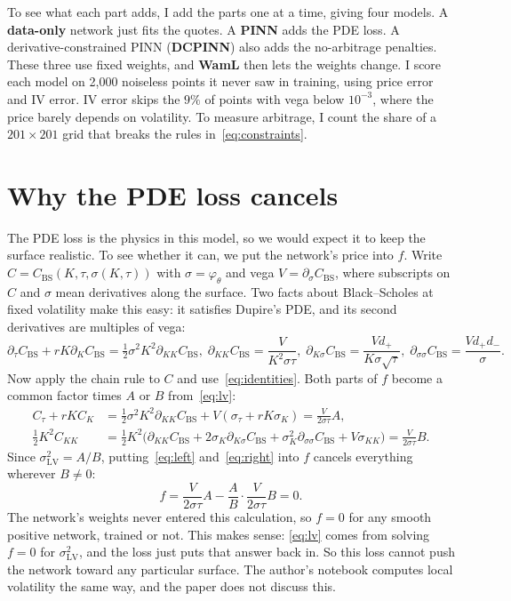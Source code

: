 \documentclass[10pt]{article}
\begin{document}
To see what each part adds, I add the parts one at a time, giving four models. A \textbf{data-only} network just fits the quotes. A \textbf{PINN} adds the PDE loss. A derivative-constrained PINN (\textbf{DCPINN}) also adds the no-arbitrage penalties. These three use fixed weights, and \textbf{WamL} then lets the weights change. I score each model on 2,000 noiseless points it never saw in training, using price error and IV error. IV error skips the $9\%$ of points with vega below $10^{-3}$, where the price barely depends on volatility. To measure arbitrage, I count the share of a $201\times201$ grid that breaks the rules in~\eqref{eq:constraints}.

\section{Why the PDE loss cancels}
\label{sec:residual}
The PDE loss is the physics in this model, so we would expect it to keep the surface realistic. To see whether it can, we put the network's price into $f$. Write $C=C_{\mathrm{BS}}(K,\tau,\sigma(K,\tau))$ with $\sigma=\varphi_\theta$ and vega $V=\partial_\sigma C_{\mathrm{BS}}$, where subscripts on $C$ and $\sigma$ mean derivatives along the surface. Two facts about Black--Scholes at fixed volatility make this easy: it satisfies Dupire's PDE, and its second derivatives are multiples of vega:
\begin{equation}
  \partial_\tau C_{\mathrm{BS}}+rK\partial_K C_{\mathrm{BS}}=\tfrac12\sigma^2K^2\partial_{KK}C_{\mathrm{BS}},\;
  \partial_{KK}C_{\mathrm{BS}}=\frac{V}{K^2\sigma\tau},\;
  \partial_{K\sigma}C_{\mathrm{BS}}=\frac{Vd_+}{K\sigma\sqrt{\tau}},\;
  \partial_{\sigma\sigma}C_{\mathrm{BS}}=\frac{Vd_+d_-}{\sigma}.
  \label{eq:identities}
\end{equation}
Now apply the chain rule to $C$ and use~\eqref{eq:identities}. Both parts of $f$ become a common factor times $A$ or $B$ from~\eqref{eq:lv}:
\begin{align}
  C_\tau+rKC_K&=\tfrac12\sigma^2K^2\partial_{KK}C_{\mathrm{BS}}+V(\sigma_\tau+rK\sigma_K)=\frac{V}{2\sigma\tau}A,\label{eq:left}\\
  \tfrac12K^2C_{KK}&=\tfrac12K^2\big(\partial_{KK}C_{\mathrm{BS}}+2\sigma_K\partial_{K\sigma}C_{\mathrm{BS}}+\sigma_K^2\partial_{\sigma\sigma}C_{\mathrm{BS}}+V\sigma_{KK}\big)=\frac{V}{2\sigma\tau}B.\label{eq:right}
\end{align}
Since $\sigma_{\mathrm{LV}}^2=A/B$, putting~\eqref{eq:left} and~\eqref{eq:right} into $f$ cancels everything wherever $B\neq0$:
\begin{equation}
  f=\frac{V}{2\sigma\tau}A-\frac{A}{B}\cdot\frac{V}{2\sigma\tau}B=0.
  \label{eq:cancel}
\end{equation}
The network's weights never entered this calculation, so $f=0$ for any smooth positive network, trained or not. This makes sense: \eqref{eq:lv} comes from solving $f=0$ for $\sigma_{\mathrm{LV}}^2$, and the loss just puts that answer back in. So this loss cannot push the network toward any particular surface. The author's notebook computes local volatility the same way, and the paper does not discuss this.
\end{document}
